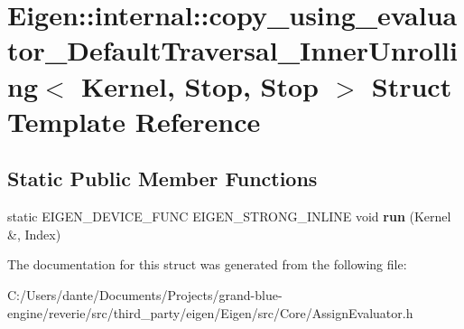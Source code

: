 \hypertarget{struct_eigen_1_1internal_1_1copy__using__evaluator___default_traversal___inner_unrolling_3_01_kernel_00_01_stop_00_01_stop_01_4}{}\section{Eigen\+::internal\+::copy\+\_\+using\+\_\+evaluator\+\_\+\+Default\+Traversal\+\_\+\+Inner\+Unrolling$<$ Kernel, Stop, Stop $>$ Struct Template Reference}
\label{struct_eigen_1_1internal_1_1copy__using__evaluator___default_traversal___inner_unrolling_3_01_kernel_00_01_stop_00_01_stop_01_4}
\subsection*{Static Public Member Functions}
\begin{DoxyCompactItemize}
\item 
\mbox{\label{struct_eigen_1_1internal_1_1copy__using__evaluator___default_traversal___inner_unrolling_3_01_kernel_00_01_stop_00_01_stop_01_4_ad378c60aa2c775fb49af7c666ec92f82}} 
static E\+I\+G\+E\+N\+\_\+\+D\+E\+V\+I\+C\+E\+\_\+\+F\+U\+NC E\+I\+G\+E\+N\+\_\+\+S\+T\+R\+O\+N\+G\+\_\+\+I\+N\+L\+I\+NE void {\bfseries run} (Kernel \&, Index)
\end{DoxyCompactItemize}


The documentation for this struct was generated from the following file\+:\begin{DoxyCompactItemize}
\item 
C\+:/\+Users/dante/\+Documents/\+Projects/grand-\/blue-\/engine/reverie/src/third\+\_\+party/eigen/\+Eigen/src/\+Core/Assign\+Evaluator.\+h\end{DoxyCompactItemize}
